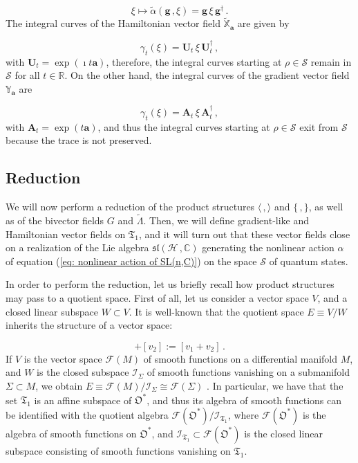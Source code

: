 \documentclass[11pt]{article}
\newcommand{\be}{\begin{equation}}
\newcommand{\ee}{\end{equation}}
\newcommand{\vsp}{\vspace{0.4cm}}
\newcommand{\stsp}{\mathcal{S}}
\newcommand{\obsp}{\mathfrak{O}}
\begin{document}
$$
\xi\mapsto \widetilde{\alpha}(\mathbf{g}\,,\xi)=\mathbf{g}\,\xi\,\mathbf{g}^{\dagger}\,.
$$
The integral curves of the Hamiltonian vector field $\widetilde{\mathbb{X}}_{\mathbf{a}}$ are given by

$$
\gamma_{t}(\xi)=\mathbf{U}_{t}\,\xi\,\mathbf{U}_{t}^{\dagger}\,,
$$
with $\mathbf{U}_{t}=\exp(\imath t\mathbf{a})$, therefore, the integral curves starting at $\rho\in\stsp$ remain in $\stsp$ for all $t\in\mathbb{R}$. On the other hand, the integral curves of the gradient vector field $\mathbb{Y}_{\mathbf{a}}$ are

$$
\gamma_{t}(\xi)=\mathbf{A}_{t}\,\xi\,\mathbf{A}_{t}^{\dagger}\,,
$$
with $\mathbf{A}_{t}=\exp(t\mathbf{a})$, and thus the integral curves starting at $\rho\in\stsp$ exit from $\stsp$ because the trace is not preserved.



\vsp

\subsection*{Reduction}

We will now perform a reduction of the product structures $\langle\,,\rangle$ and $\{\,,\}$, as well as of the bivector fields $G$ and $\widetilde{\Lambda}$.
Then, we will define gradient-like and Hamiltonian vector fields on $\mathfrak{T}_{1}$, and it will turn out that these vector fields close on a realization of the Lie algebra $\mathfrak{sl}(\mathcal{H}\,,\mathbb{C})$ generating the nonlinear action $\alpha$ of equation (\ref{eq: nonlinear action of SL(n,C)}) on the space $\stsp$ of quantum states.

\vsp




In order to perform the reduction, let us briefly recall how product structures may pass to a quotient space.
First of all, let us consider a vector space $V$, and a closed linear subspace $W\subset V$.
It is well-known that the quotient space $E\equiv V/W$ inherits the structure of a vector space:

\be
[v_{1}] + [v_{2}]:= [v_{1} + v_{2}]\,.
\ee
If $V$ is the vector space $\mathcal{F}(M)$ of smooth functions on a differential manifold $M$, and $W$ is the closed subspace $\mathcal{I}_{\Sigma}$ of smooth functions vanishing on a submanifold $\Sigma\subset M$, we obtain $E\equiv \mathcal{F}(M)/\mathcal{I}_{\Sigma}\cong \mathcal{F}(\Sigma)$ \cite{carinena_ibort_marmo_morandi-geometry_from_dynamics_classical_and_quantum}. 
In particular, we have that the set $\mathfrak{T}_{1}$ is an affine subspace of $\obsp^{*}$, and thus its algebra of smooth functions can be identified with the quotient algebra $\mathcal{F}(\obsp^{*})/\mathcal{I}_{\mathfrak{T}_{1}}$, where $\mathcal{F}(\obsp^{*})$ is the algebra of smooth functions on $\obsp^{*}$, and $\mathcal{I}_{\mathfrak{T}_{1}}\subset \mathcal{F}(\obsp^{*})$ is the closed linear subspace consisting of smooth functions vanishing on $\mathfrak{T}_{1}$.
\end{document}
